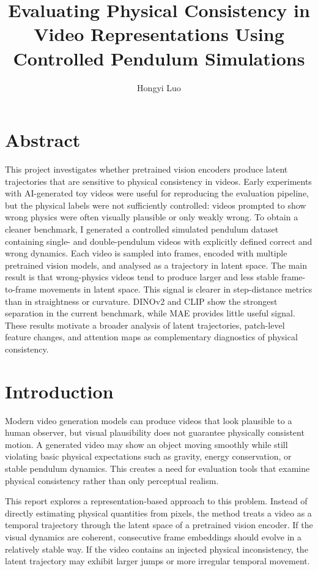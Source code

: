 \documentclass[final-report]{report-template}
\title{Evaluating Physical Consistency in Video Representations Using Controlled Pendulum Simulations}
\author{Hongyi Luo}
\begin{document}
\maketitlepage  %

\section*{Abstract}
This project investigates whether pretrained vision encoders produce latent
trajectories that are sensitive to physical consistency in videos. Early
experiments with AI-generated toy videos were useful for reproducing the
evaluation pipeline, but the physical labels were not sufficiently controlled:
videos prompted to show wrong physics were often visually plausible or only
weakly wrong. To obtain a cleaner benchmark, I generated a controlled simulated
pendulum dataset containing single- and double-pendulum videos with explicitly
defined correct and wrong dynamics. Each video is sampled into frames, encoded
with multiple pretrained vision models, and analysed as a trajectory in latent
space. The main result is that wrong-physics videos tend to produce larger and
less stable frame-to-frame movements in latent space. This signal is clearer in
step-distance metrics than in straightness or curvature. DINOv2 and CLIP show
the strongest separation in the current benchmark, while MAE provides little
useful signal. These results motivate a broader analysis of latent trajectories,
patch-level feature changes, and attention maps as complementary diagnostics of
physical consistency.

\section{Introduction}
Modern video generation models can produce videos that look plausible to a
human observer, but visual plausibility does not guarantee physically consistent
motion. A generated video may show an object moving smoothly while still
violating basic physical expectations such as gravity, energy conservation, or
stable pendulum dynamics. This creates a need for evaluation tools that examine
physical consistency rather than only perceptual realism.

This report explores a representation-based approach to this problem. Instead
of directly estimating physical quantities from pixels, the method treats a
video as a temporal trajectory through the latent space of a pretrained vision
encoder. If the visual dynamics are coherent, consecutive frame embeddings
should evolve in a relatively stable way. If the video contains an injected
physical inconsistency, the latent trajectory may exhibit larger jumps or more
irregular temporal movement.
\end{document}

